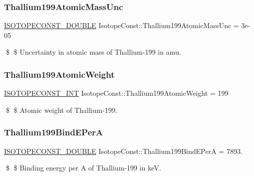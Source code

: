 \subsubsection{\texorpdfstring{Thallium199\+Atomic\+Mass\+Unc}{Thallium199AtomicMassUnc}}
{\footnotesize\ttfamily \mbox{\hyperlink{group___isotope_const-_macros_ga8f45a7272ce02c0b4c65c44636ed719a}{I\+S\+O\+T\+O\+P\+E\+C\+O\+N\+S\+T\+\_\+\+D\+O\+U\+B\+LE}} Isotope\+Const\+::\+Thallium199\+Atomic\+Mass\+Unc = 3e-\/05}

\$ \$ Uncertainty in atomic mass of Thallium-\/199 in amu. \mbox{\label{group___isotope_const-_thallium-_tl199_ga708b6be9154064f47ac12e89bcb0789b}} 
\subsubsection{\texorpdfstring{Thallium199\+Atomic\+Weight}{Thallium199AtomicWeight}}
{\footnotesize\ttfamily \mbox{\hyperlink{group___isotope_const-_macros_ga5f18360b3e99483a35c32d789e62621c}{I\+S\+O\+T\+O\+P\+E\+C\+O\+N\+S\+T\+\_\+\+I\+NT}} Isotope\+Const\+::\+Thallium199\+Atomic\+Weight = 199}

\$ \$ Atomic weight of Thallium-\/199. \mbox{\label{group___isotope_const-_thallium-_tl199_ga21db591f76cdefa1cb1bcf8b00ccc900}} 
\subsubsection{\texorpdfstring{Thallium199\+Bind\+E\+PerA}{Thallium199BindEPerA}}
{\footnotesize\ttfamily \mbox{\hyperlink{group___isotope_const-_macros_ga8f45a7272ce02c0b4c65c44636ed719a}{I\+S\+O\+T\+O\+P\+E\+C\+O\+N\+S\+T\+\_\+\+D\+O\+U\+B\+LE}} Isotope\+Const\+::\+Thallium199\+Bind\+E\+PerA = 7893.}

\$ \$ Binding energy per A of Thallium-\/199 in keV. \mbox{\label{group___isotope_const-_thallium-_tl199_ga7a660068f324c88d2999e72809e1b4a6}} 
